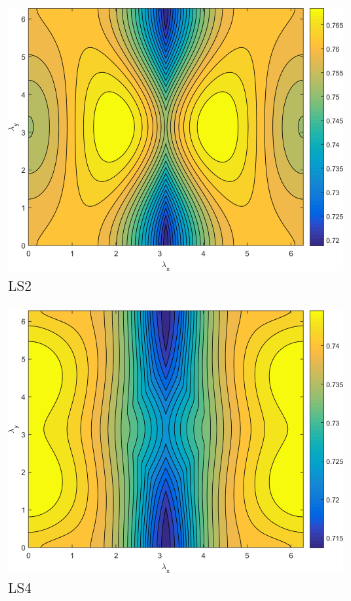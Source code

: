\begin{figure}
\centering
	{
	\begin{subfigure}[b]{0.485\textwidth}
		\centering
		\includegraphics[width=0.975\textwidth]{figures/sec_DSA/PHI_SI_MIP_C=4_UPWLD1_LS2_sigt=10_c=9_contour.png}
		\caption{LS2}
	\end{subfigure}
	\hfill
	\begin{subfigure}[b]{0.485\textwidth}
		\centering
		\includegraphics[width=0.975\textwidth]{figures/sec_DSA/PHI_SI_MIP_C=4_UPWLD1_LS4_sigt=10_c=9_contour.png}
		\caption{LS4}
	\end{subfigure}
	}
	\vspace{1.5cm}
	{
	\begin{subfigure}[b]{0.485\textwidth}

\end{subfigure}}
\end{figure}
